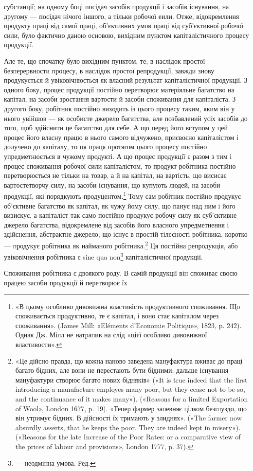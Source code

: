 \parcont{}  %
субстанції; на одному боці посідач засобів продукції і засобів
існування, на другому — посідач нічого іншого, а тільки робочої
еили. Отже, відокремлення продукту праці від самої праці, об’єктивних
умов праці від суб’єктивної робочої сили, було фактично
даною основою, вихідним пунктом капіталістичного процесу
продукції.

Але те, що спочатку було вихідним пунктом, те, в наслідок
простої безперервности процесу, в наслідок простої репродукції,
завжди знову продукується й увіковічнюється як власний результат
капіталістичної продукції. З одного боку, процес продукції
постійно перетворює матеріяльне багатство на капітал,
на засоби зростання вартости й засоби споживання для капіталіста.
З другого боку, робітник постійно виходить із цього процесу
таким, яким він у нього увійшов — як особисте джерело
багатства, але позбавлений усіх засобів до того, щоб здійснити
це багатство для себе. А що перед його вступом у цей процес
його власну працю в нього самого відчужено, присвоєно капіталістом
і долучено до капіталу, то ця праця протягом цього процесу
постійно упредметнюється в чужому продукті. А що процес
продукції є разом з тим і процес споживання робочої сили капіталістом,
то продукт робітника постійно перетворюється не
тільки на товар, а й на капітал, на вартість, що висисає вартостетворчу
силу, на засоби існування, що купують людей, на засоби
продукції, які порядкують продуцентом.\footnote{
«В цьому особливо дивовижна властивість продуктивного споживання.
Що споживається продуктивно, те є капітал, і воно стає капіталом
через споживання». (James Mill: «Eléments d’Economie Politique», 1823,
p. 242). Однак Дж. Мілл не натрапив на слід «цієї особливо дивовижної
властивости».
} Тому сам робітник
постійно продукує об’єктивне багатство як капітал, як чужу
йому силу, що панує над ним і його визискує, а капіталіст так
само постійно продукує робочу силу як суб’єктивне джерело
багатства, відокремлене від засобів його власного упредметнення
і здійснення, абстрактне джерело, що існує в простій тілесності
робітника, коротко — продукує робітника як найманого робітника.\footnote{
«Це дійсно правда, що кожна наново заведена мануфактура вживає
до праці багато бідних, але вони не перестають бути бідними; дальше
існування мануфактури створює багато нових бідняків» («It is true indeed
that the first introducing a manufacture employes many poor, but
they cease not to be so, and the continuance of it makes many»). («Reasons
for a limited Exportation of Wool», London 1677, p. 19). «Тепер фармер
запевняє цілком безглуздо, що він утримує бідних. В дійсності їх тримають
у злиднях». («The farmer now absurdly asserts, that he keeps the
poor. They are indeed kept in misery»). («Reasons for the late Increase
of the Poor Rates: or a comparative view of the prices of labour and provisions»,
London 1777, p. 37).
}
Ця постійна репродукція, або увіковічнення робітника
є sine qua non\footnote*{
— неодмінна умова. Ред.
} капіталістичної продукції.

Споживання робітника є двоякого роду. В самій продукції
він споживає своєю працею засоби продукції й перетворює їх
\parbreak{}  %

